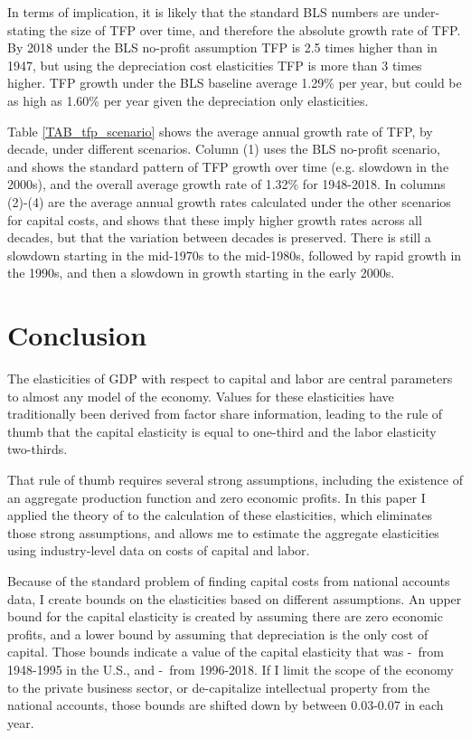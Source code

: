 \documentclass[11pt]{article}
\begin{document}
In terms of implication, it is likely that the standard BLS numbers are under-stating the size of TFP over time, and therefore the absolute growth rate of TFP. By 2018 under the BLS no-profit assumption TFP is 2.5 times higher than in 1947, but using the depreciation cost elasticities TFP is more than 3 times higher. TFP growth under the BLS baseline average 1.29\% per year, but could be as high as 1.60\% per year given the depreciation only elasticities.

Table \ref{TAB_tfp_scenario} shows the average annual growth rate of TFP, by decade, under different scenarios. Column (1) uses the BLS no-profit scenario, and shows the standard pattern of TFP growth over time (e.g. slowdown in the 2000s), and the overall average growth rate of 1.32\% for 1948-2018. In columns (2)-(4) are the average annual growth rates calculated under the other scenarios for capital costs, and shows that these imply higher growth rates across all decades, but that the variation between decades is preserved. There is still a slowdown starting in the mid-1970s to the mid-1980s, followed by rapid growth in the 1990s, and then a slowdown in growth starting in the early 2000s.

\section{Conclusion}
The elasticities of GDP with respect to capital and labor are central parameters to almost any model of the economy. Values for these elasticities have traditionally been derived from factor share information, leading to the rule of thumb that the capital elasticity is equal to one-third and the labor elasticity two-thirds. 

That rule of thumb requires several strong assumptions, including the existence of an aggregate production function and zero economic profits. In this paper I applied the theory of \cite{bfshortnote,bfprodge} to the calculation of these elasticities, which eliminates those strong assumptions, and allows me to estimate the aggregate elasticities using industry-level data on costs of capital and labor. 

Because of the standard problem of finding capital costs from national accounts data, I create bounds on the elasticities based on different assumptions. An upper bound for the capital elasticity is created by assuming there are zero economic profits, and a lower bound by assuming that depreciation is the only cost of capital. Those bounds indicate a value of the capital elasticity that was \baseearlydepr-\baseearlynoprofit \ from 1948-1995 in the U.S., and \baselatedepr-\baselatenoprofit \ from 1996-2018. If I limit the scope of the economy to the private business sector, or de-capitalize intellectual property from the national accounts, those bounds are shifted down by between 0.03-0.07 in each year.
\end{document}
